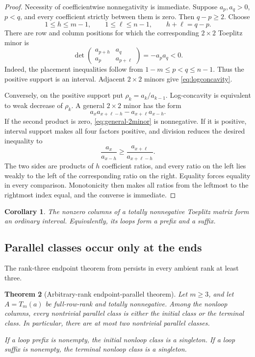 \documentclass[11pt]{amsart}
\newtheorem{theorem}{Theorem}[section]
\newtheorem{corollary}[theorem]{Corollary}
\theoremstyle{definition}
\theoremstyle{remark}
\begin{document}
\begin{proof}
Necessity of coefficientwise nonnegativity is immediate.  Suppose $a_p,a_q>0$, $p<q$, and every coefficient strictly between them is zero.  Then $q-p\ge2$.  Choose
\[
 1\le h\le m-1,\qquad 1\le\ell\le n-1,
 \qquad h+\ell=q-p.
\]
There are row and column positions for which the corresponding $2\times2$ Toeplitz minor is
\[
 \det\begin{pmatrix}
 a_{p+h}&a_q\\
 a_p&a_{p+\ell}
 \end{pmatrix}=-a_pa_q<0.
\]
Indeed, the placement inequalities follow from $1-m\le p<q\le n-1$.  Thus the positive support is an interval.  Adjacent $2\times2$ minors give \eqref{eq:logconcavity}.

Conversely, on the positive support put $\rho_k=a_k/a_{k-1}$.  Log-concavity is equivalent to weak decrease of $\rho_k$.  A general $2\times2$ minor has the form
\begin{equation}\label{eq:general-2minor}
 a_xa_{x+\ell-h}-a_{x+\ell}a_{x-h}.
\end{equation}
If the second product is zero, \eqref{eq:general-2minor} is nonnegative.  If it is positive, interval support makes all four factors positive, and division reduces the desired inequality to
\[
 \frac{a_x}{a_{x-h}}\ge\frac{a_{x+\ell}}{a_{x+\ell-h}}.
\]
The two sides are products of $h$ coefficient ratios, and every ratio on the left lies weakly to the left of the corresponding ratio on the right.  Equality forces equality in every comparison.  Monotonicity then makes all ratios from the leftmost to the rightmost index equal, and the converse is immediate.
\end{proof}

\begin{corollary}\label{cor:loops-interval}
The nonzero columns of a totally nonnegative Toeplitz matrix form an ordinary interval.  Equivalently, its loops form a prefix and a suffix.
\end{corollary}

\subsection{Parallel classes occur only at the ends}

The rank-three endpoint theorem from \cite{CGQlow} persists in every ambient rank at least three.

\begin{theorem}[Arbitrary-rank endpoint-parallel theorem]\label{thm:endpoint-parallel}
Let $m\ge3$, and let $A=T_m(a)$ be full-row-rank and totally nonnegative.  Among the nonloop columns, every nontrivial parallel class is either the initial class or the terminal class.  In particular, there are at most two nontrivial parallel classes.

If a loop prefix is nonempty, the initial nonloop class is a singleton.  If a loop suffix is nonempty, the terminal nonloop class is a singleton.
\end{theorem}
\end{document}
